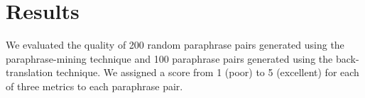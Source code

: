 \documentclass[fleqn,moreauthors,10pt]{ds_report}
\begin{document}

\section*{Results}
 We evaluated the quality of 200 random paraphrase pairs generated using the paraphrase-mining technique and 100 paraphrase pairs generated using the back-translation technique. We assigned a score from 1 (poor) to 5 (excellent) for each of three metrics to each paraphrase pair.
\end{document}

